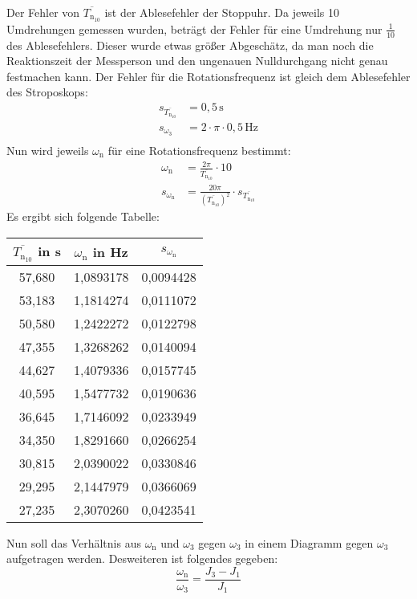 Der Fehler von $\overline{T_{\text{n}_{10}}}$ ist der Ablesefehler der Stoppuhr.
Da jeweils 10 Umdrehungen gemessen wurden, beträgt der Fehler für eine Umdrehung nur $\frac{1}{10}$ des Ablesefehlers.
Dieser wurde etwas größer Abgeschätz, da man noch die Reaktionszeit der Messperson und den ungenauen Nulldurchgang nicht genau festmachen kann.
Der Fehler für die Rotationsfrequenz ist gleich dem Ablesefehler des Stroposkops:
\begin{align*}
    s_{\overline{T_{\text{n}_{10}}}}&=0,5\,\text{s}\\
    s_{\omega_{3}}&=2\cdot\pi\cdot0,5\,\text{Hz}\\
\end{align*} 
Nun wird jeweils $\omega_\text{n}$ für eine Rotationsfrequenz bestimmt:
\begin{align*}
    \omega_\text{n}&=\frac{2\pi}{\overline{T_{\text{n}_{10}}}}\cdot 10\\
    s_{\omega_\text{n}}&=\frac{20\pi}{\left(\overline{T_{\text{n}_{10}}}\right)^2}\cdot s_{\overline{T_{\text{n}_{10}}}}
\end{align*}
Es ergibt sich folgende Tabelle:
\begin{center}
    \begin{tabular}{c|c|c}
        $\overline{T_{\text{n}_{10}}}$ in s & $\omega_\text{n}$ in Hz & $s_{\omega_\text{n}}$\\
        \hline
        57,680&1,0893178&0,0094428\\
        53,183&1,1814274&0,0111072\\
        50,580&1,2422272&0,0122798\\
        47,355&1,3268262&0,0140094\\
        44,627&1,4079336&0,0157745\\
        40,595&1,5477732&0,0190636\\
        36,645&1,7146092&0,0233949\\
        34,350&1,8291660&0,0266254\\
        30,815&2,0390022&0,0330846\\
        29,295&2,1447979&0,0366069\\
        27,235&2,3070260&0,0423541
    \end{tabular}
\end{center}
Nun soll das Verhältnis aus $\omega_\text{n}$ und $\omega_3$ gegen $\omega_3$ in einem Diagramm gegen $\omega_3$ aufgetragen werden.
Desweiteren ist folgendes gegeben:
\begin{equation*}
    \frac{\omega_\text{n}}{\omega_3}=\frac{J_3-J_1}{J_1}
\end{equation*}
